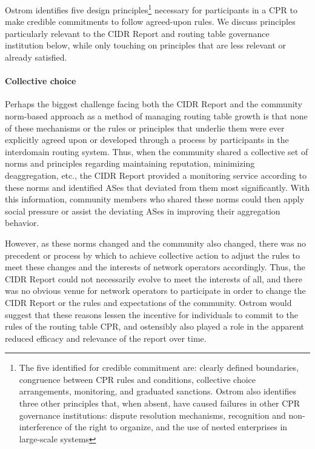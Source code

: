 Ostrom \cite{Ostrom:1990fv} identifies five design principles\footnote{
The five identified for credible commitment are: clearly defined boundaries,
congruence between CPR rules and conditions, collective choice arrangements,
monitoring, and graduated sanctions. Ostrom also identifies three other
principles that, when absent, have caused failures in other CPR governance
institutions: dispute resolution mechanisms, recognition and non-interference of
the right to organize, and the use of nested enterprises in large-scale
systems}
necessary for participants in a CPR to make credible commitments to
follow agreed-upon rules. We discuss principles particularly relevant to the
CIDR Report and routing table governance institution below, while only touching
on principles that are less relevant or already satisfied.


\paragraph{Collective choice}
Perhaps the biggest challenge facing both the CIDR Report and the community
norm-based approach as a method of managing routing table growth is that none
of these mechanisms or the rules or principles that underlie them were ever
explicitly agreed upon or developed through a process by participants in the
interdomain routing system. Thus, when the community shared a collective set
of norms and principles regarding maintaining reputation, minimizing
deaggregation, etc., the CIDR Report provided a monitoring service according to
these norms and identified ASes that deviated from them most significantly.
With this information, community members who shared these norms could then
apply social pressure or assist the deviating ASes in improving their
aggregation behavior.

However, as these norms changed and the community also changed, there was no
precedent or process by which to achieve collective action to adjust the rules
to meet these changes and the interests of network operators accordingly. Thus,
the CIDR Report could not necessarily evolve to meet the interests of all, and
there was no obvious venue for network operators to participate in order to
change the CIDR Report or the rules and expectations of the community. Ostrom
would suggest that these reasons lessen the incentive for individuals to commit
to the rules of the routing table CPR, and ostensibly also played a role in the
apparent reduced efficacy and relevance of the report over time.

